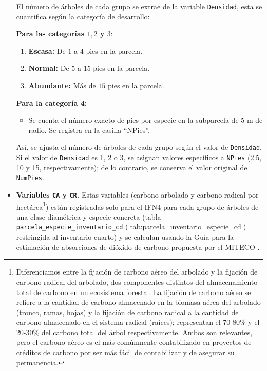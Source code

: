 \begin{itemize}
    El número de árboles de cada grupo se extrae de la variable \texttt{Densidad}, esta se cuantifica según la categoría de desarrollo:
    
    \medskip
    
    \textbf{Para las categorías $1, 2$ y $3$}:
    \begin{enumerate}
        \item \textbf{Escasa:} De $1$ a $4$ pies en la parcela.
        \item \textbf{Normal:} De $5$ a $15$ pies en la parcela.
        \item \textbf{Abundante:} Más de $15$ pies en la parcela.
    
    \medskip
    
    \end{enumerate}
    \textbf{Para la categoría 4:}
    \begin{itemize}
        \item Se cuenta el número exacto de pies por especie en la subparcela de 5 m de radio. Se registra en la casilla ``NPies''.
    \end{itemize}
    
    \medskip
    
    Así, se ajusta el número de árboles de cada grupo según el valor de \texttt{Densidad}. Si el valor de \texttt{Densidad} es 1, 2 o 3, se asignan valores específicos a \texttt{NPies} (2.5, 10 y 15, respectivamente); de lo contrario, se conserva el valor original de \texttt{NumPies}.
    
    \medskip

    \item \textbf{Variables \texttt{CA} y \texttt{CR}.} Estas variables (carbono arbolado y carbono radical por hectárea\footnote{Diferenciamos entre la fijación de carbono aéreo del arbolado y la fijación de carbono radical del arbolado, dos componentes distintos del almacenamiento total de carbono en un ecosistema forestal. La fijación de carbono aéreo se refiere a la cantidad de carbono almacenado en la biomasa aérea del arbolado (tronco, ramas, hojas) y la fijación de carbono radical a la cantidad de carbono almacenado en el sistema radical (raíces); representan el 70-80\% y el 20-30\% del carbono total del árbol respectivamente. Ambos son relevantes, pero el carbono aéreo es el más comúnmente contabilizado en proyectos de créditos de carbono por ser más fácil de contabilizar y de asegurar su permanencia. }) están registradas solo para el IFN4 para cada grupo de árboles de una clase diamétrica y especie concreta (tabla \texttt{parcela\_especie\_inventario\_cd} (\ref{tab:parcela_inventario_especie_cd}) restringida al inventario cuarto) y se calculan usando la Guía para la estimación de absorciones de dióxido de carbono propuesta por el MITECO \cite{miteco_guia_co2}. 


\end{itemize}
